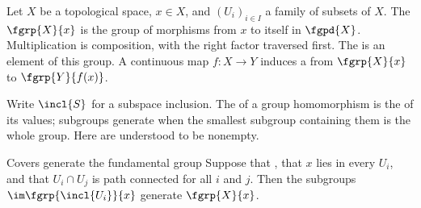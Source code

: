 Let $X$ be a topological space, $x\in X$, and $(U_i)_{i\in I}$ a family of
subsets of $X$.
The 
$\fgrp{X}{x}$ is the group of morphisms from $x$ to itself in $\fgpd{X}$.
Multiplication is composition, with the right factor traversed first.
The  is an element
of this group.  A continuous map $f:X\longrightarrow Y$ induces a
 from $\fgrp{X}{x}$ to
$\fgrp{Y}{f(x)}$.

Write $\incl{S}$ for a subspace inclusion.  The
 of a group homomorphism is the
 of its values; subgroups generate when the
smallest subgroup containing them is the whole group.  Here
 are understood to be
nonempty.

\begin{theorem}[id=4.1]{Covers generate the fundamental group}
Suppose that \hypCoverFamily, that $x$ lies in every $U_{i}$, and that
$U_{i} \cap U_{j}$ is path connected for all $i$ and $j$.  Then the subgroups
$\im \fgrp{\incl{U_{i}}}{x}$ generate $\fgrp{X}{x}$.
\end{theorem}

